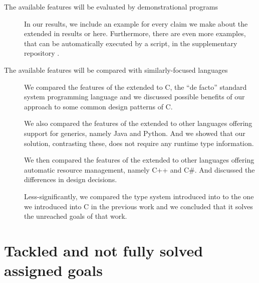 \begin{description}
    \item[The available features will be evaluated by demonstrational programs] In our results, we include an example for every claim we make about the extended \cmm in results or here. Furthermore, there are even more examples, that can be automatically executed by a script, in the supplementary repository \cite{klepl2022compiler}.

    \item[The available features will be compared with similarly-focused languages] We compared the features of the extended \cmm to C, the ``de facto'' standard system programming language and we discussed possible benefits of our approach to some common design patterns of C.

    We also compared the features of the extended \cmm to other languages offering support for generics, namely Java and Python. And we showed that our solution, contrasting these, does not require any runtime type information.

    We then compared the features of the extended \cmm to other languages offering automatic resource management, namely C++ and C\#. And discussed the differences in design decisions.

    Less-significantly, we compared the type system introduced into \cmm to the one we introduced into C in the previous work and we concluded that it solves the unreached goals of that work.
\end{description}

\section*{Tackled and not fully solved assigned goals}

